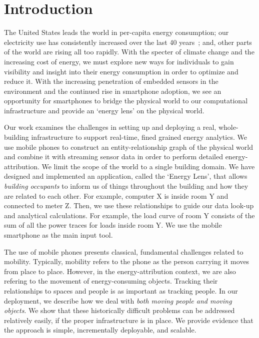 \section{Introduction}
The United States leads the world in per-capita energy consumption; 
our electricity use has consistently increased over the last 40 years~\cite{oecd2011}; and, other parts of the world are rising all 
too rapidly.  With the specter of climate change and the increasing cost of energy, we must explore new
ways for individuals to gain visibility and insight into their energy consumption in order to optimize and reduce it. 
With the increasing penetration of embedded sensors in the environment and
the continued rise in smartphone adoption, we see an opportunity for smartphones to bridge the physical world
to our computational infrastructure and provide an `energy lens' on the physical world.  

Our work examines the challenges in setting up and deploying a real, whole-building infrastructure to support real-time, 
fined grained energy analytics.  We use mobile phones to construct an entity-relationship 
graph of the physical world and combine it with streaming sensor data in order to perform detailed energy-attribution.
We limit the scope of the world to a single building domain.  We have 
designed and implemented an application, called the `Energy Lens', that allows \emph{building occupants} to inform us 
of things throughout the building and how they are related to each other.  For example, computer X is inside 
room Y and connected to meter Z.  Then, we use these relationships to guide our data look-up and analytical
calculations.  For example, the load curve of room Y consists of the sum of all the power traces for loads
inside room Y.  We use the mobile smartphone as the main input tool.

The use of mobile phones presents classical, fundamental challenges related to mobility.  Typically, mobility
refers to the phone as the person carrying it moves from place to place.  However, in the energy-attribution
context, we are also refering to the movement of energy-consuming objects.  Tracking their relationships to spaces 
and people is as important as tracking people.  In our deployment, we describe how we deal with \emph{both moving people and 
moving objects}.  We show that these historically difficult problems can be addressed relatively easily, if the proper infrastructure is 
in place.  We provide evidence that the approach is simple, incrementally deployable, and scalable.

